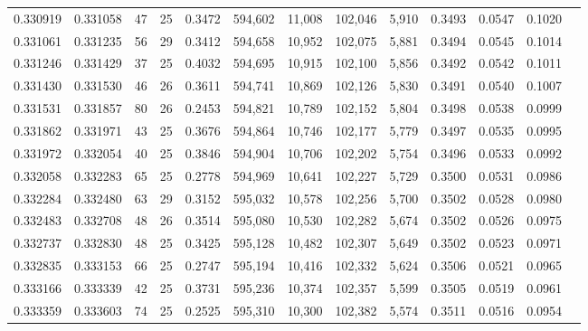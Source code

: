 \begin{tabular}{rrrrrrrrrrrrr}
0.330919 & 0.331058 &  47 &  25 &                                     0.3472 & 594,602 &  11,008 & 102,046 &   5,910 & 0.3493 & 0.0547 & 0.1020 \\
0.331061 & 0.331235 &  56 &  29 &                                     0.3412 & 594,658 &  10,952 & 102,075 &   5,881 & 0.3494 & 0.0545 & 0.1014 \\
0.331246 & 0.331429 &  37 &  25 &                                     0.4032 & 594,695 &  10,915 & 102,100 &   5,856 & 0.3492 & 0.0542 & 0.1011 \\
0.331430 & 0.331530 &  46 &  26 &                                     0.3611 & 594,741 &  10,869 & 102,126 &   5,830 & 0.3491 & 0.0540 & 0.1007 \\
0.331531 & 0.331857 &  80 &  26 &                                     0.2453 & 594,821 &  10,789 & 102,152 &   5,804 & 0.3498 & 0.0538 & 0.0999 \\
0.331862 & 0.331971 &  43 &  25 &                                     0.3676 & 594,864 &  10,746 & 102,177 &   5,779 & 0.3497 & 0.0535 & 0.0995 \\
0.331972 & 0.332054 &  40 &  25 &                                     0.3846 & 594,904 &  10,706 & 102,202 &   5,754 & 0.3496 & 0.0533 & 0.0992 \\
0.332058 & 0.332283 &  65 &  25 &                                     0.2778 & 594,969 &  10,641 & 102,227 &   5,729 & 0.3500 & 0.0531 & 0.0986 \\
0.332284 & 0.332480 &  63 &  29 &                                     0.3152 & 595,032 &  10,578 & 102,256 &   5,700 & 0.3502 & 0.0528 & 0.0980 \\
0.332483 & 0.332708 &  48 &  26 &                                     0.3514 & 595,080 &  10,530 & 102,282 &   5,674 & 0.3502 & 0.0526 & 0.0975 \\
0.332737 & 0.332830 &  48 &  25 &                                     0.3425 & 595,128 &  10,482 & 102,307 &   5,649 & 0.3502 & 0.0523 & 0.0971 \\
0.332835 & 0.333153 &  66 &  25 &                                     0.2747 & 595,194 &  10,416 & 102,332 &   5,624 & 0.3506 & 0.0521 & 0.0965 \\
0.333166 & 0.333339 &  42 &  25 &                                     0.3731 & 595,236 &  10,374 & 102,357 &   5,599 & 0.3505 & 0.0519 & 0.0961 \\
0.333359 & 0.333603 &  74 &  25 &                                     0.2525 & 595,310 &  10,300 & 102,382 &   5,574 & 0.3511 & 0.0516 & 0.0954 \\

\end{tabular}
